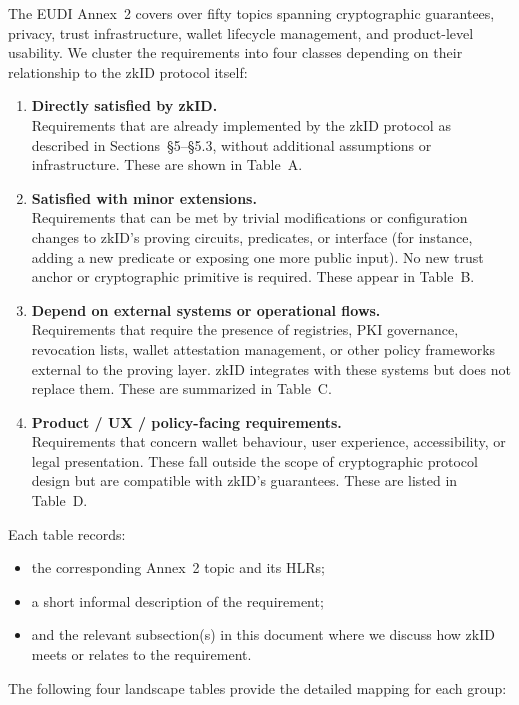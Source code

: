 
\noindent The EUDI Annex~2 covers over fifty topics spanning cryptographic guarantees, privacy, trust infrastructure, wallet lifecycle management, and product-level usability. We cluster the requirements into four classes depending on their relationship to the zkID protocol itself:

\begin{enumerate}[label=\textbf{Group \Alph*:}]
  \item \textbf{Directly satisfied by zkID.} \\
  Requirements that are already implemented by the zkID protocol as described in Sections~\S5--\S5.3, without additional assumptions or infrastructure. These are shown in Table~A.

  \item \textbf{Satisfied with minor extensions.} \\
  Requirements that can be met by trivial modifications or configuration changes to zkID’s proving circuits, predicates, or interface (for instance, adding a new predicate or exposing one more public input). No new trust anchor or cryptographic primitive is required. These appear in Table~B.

  \item \textbf{Depend on external systems or operational flows.} \\
  Requirements that require the presence of registries, PKI governance, revocation lists, wallet attestation management, or other policy frameworks external to the proving layer. zkID integrates with these systems but does not replace them. These are summarized in Table~C.

  \item \textbf{Product / UX / policy-facing requirements.} \\
  Requirements that concern wallet behaviour, user experience, accessibility, or legal presentation. These fall outside the scope of cryptographic protocol design but are compatible with zkID’s guarantees. These are listed in Table~D.
\end{enumerate}

\medskip
\noindent
Each table records:
\begin{itemize}
  \item the corresponding Annex~2 topic and its HLRs;
  \item a short informal description of the requirement;
  \item and the relevant subsection(s) in this document where we discuss how zkID meets or relates to the requirement.
\end{itemize}

\medskip
\noindent
The following four landscape tables provide the detailed mapping for each group:

